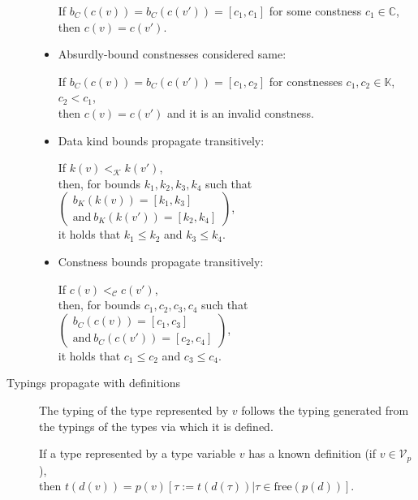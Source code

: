 \begin{description}
\begin{itemize}
            If $b_C (c (v)) = b_C (c (v')) = [c_1, c_1]$ for some constness $c_1 \in \mathbb{C}$, \\
            then $c (v) = c (v')$.

            \item Absurdly-bound constnesses considered same:

            If $b_C (c (v)) = b_C (c (v')) = [c_1, c_2]$ for constnesses $c_1, c_2 \in \mathbb{K}$, $c_2 < c_1$, \\
            then $c (v) = c (v')$ and it is an invalid constness.

            \item Data kind bounds propagate transitively:

            If $k (v) <_{\mathcal{K}} k (v')$, \\
            then, for bounds $k_1, k_2, k_3, k_4$ such that $
            \left(\begin{array}{r}b_K (k (v)) = [k_1, k_3] \\ \text{and}\ b_K (k (v')) = [k_2, k_4]\end{array}\right)$, \\
            it holds that $k_1 \leq k_2$ and $k_3 \leq k_4$.

            \item Constness bounds propagate transitively:

            If $c (v) <_{\mathcal{C}} c (v')$, \\
            then, for bounds $c_1, c_2, c_3, c_4$ such that $\left(\begin{array}{r}b_C (c (v)) = [c_1, c_3] \\\text{and}\ b_C (c (v')) = [c_2, c_4]\end{array}\right)$, \\
            it holds that $c_1 \leq c_2$ and $c_3 \leq c_4$.
        \end{itemize}

    \item[Typings propagate with definitions] The typing of the type represented by $v$ follows the typing generated from the typings of the types via which it is defined.

    If a type represented by a type variable $v$ has a known definition (if $v \in \mathcal{V}_p$), \\
    then $t (d (v)) = p(v) \left[ \tau := t (d (\tau)) | \tau \in \mathrm{free} (p (d))\right]$.
\end{description}

